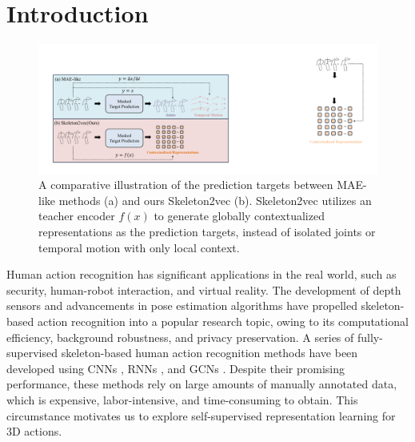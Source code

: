 \section{Introduction}
\label{sec:intro}


\begin{figure}
  \centering
  \includegraphics[width=0.80\linewidth]{figures/fig_mae_and_skeleton2vec.pdf}
    \caption{
    A comparative illustration of the prediction targets between MAE-like methods (a) and
    ours Skeleton2vec (b). Skeleton2vec utilizes an teacher encoder $f(x)$ to generate
    globally contextualized representations as the prediction targets, instead of
    isolated joints or temporal motion with only local context.
    }
    \label{fig1}
    \vspace{-15pt}
\end{figure}

Human action recognition has significant applications in the real world, such as
security, human-robot interaction, and virtual reality. The development of depth
sensors and advancements in pose estimation algorithms \cite{2018OpenPose, fang2017rmpe, xu2020deep}
have propelled skeleton-based action recognition into a popular research topic,
owing to its computational efficiency, background robustness, and privacy preservation.
A series of fully-supervised skeleton-based human action recognition methods have
been developed using CNNs \cite{du2015skeleton,li2017skeleton}, RNNs \cite{liu2016spatio,zhang2017view},
and GCNs \cite{yan2018spatial,chen2021channel}. Despite their promising performance,
these methods rely on large amounts of manually annotated data, which is expensive,
labor-intensive, and time-consuming to obtain. This circumstance motivates us
to explore self-supervised representation learning for 3D actions.

